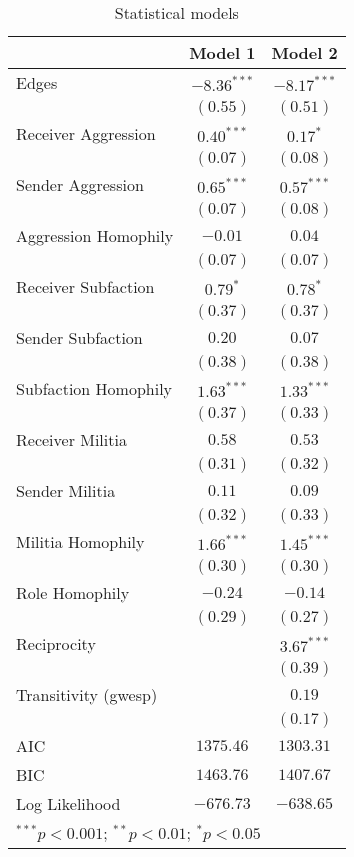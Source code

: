
\begin{table}
\begin{center}
\begin{tabular}{l c c}
\hline
 & Model 1 & Model 2 \\
\hline
Edges                & $-8.36^{***}$ & $-8.17^{***}$ \\
                     & $(0.55)$      & $(0.51)$      \\
Receiver Aggression  & $0.40^{***}$  & $0.17^{*}$    \\
                     & $(0.07)$      & $(0.08)$      \\
Sender Aggression    & $0.65^{***}$  & $0.57^{***}$  \\
                     & $(0.07)$      & $(0.08)$      \\
Aggression Homophily & $-0.01$       & $0.04$        \\
                     & $(0.07)$      & $(0.07)$      \\
Receiver Subfaction  & $0.79^{*}$    & $0.78^{*}$    \\
                     & $(0.37)$      & $(0.37)$      \\
Sender Subfaction    & $0.20$        & $0.07$        \\
                     & $(0.38)$      & $(0.38)$      \\
Subfaction Homophily & $1.63^{***}$  & $1.33^{***}$  \\
                     & $(0.37)$      & $(0.33)$      \\
Receiver Militia     & $0.58$        & $0.53$        \\
                     & $(0.31)$      & $(0.32)$      \\
Sender Militia       & $0.11$        & $0.09$        \\
                     & $(0.32)$      & $(0.33)$      \\
Militia Homophily    & $1.66^{***}$  & $1.45^{***}$  \\
                     & $(0.30)$      & $(0.30)$      \\
Role Homophily       & $-0.24$       & $-0.14$       \\
                     & $(0.29)$      & $(0.27)$      \\
Reciprocity          &               & $3.67^{***}$  \\
                     &               & $(0.39)$      \\
Transitivity (gwesp) &               & $0.19$        \\
                     &               & $(0.17)$      \\
\hline
AIC                  & $1375.46$     & $1303.31$     \\
BIC                  & $1463.76$     & $1407.67$     \\
Log Likelihood       & $-676.73$     & $-638.65$     \\
\hline
\multicolumn{3}{l}{\scriptsize{$^{***}p<0.001$; $^{**}p<0.01$; $^{*}p<0.05$}}
\end{tabular}
\caption{Statistical models}
\label{tab:ergms}
\end{center}
\end{table}
